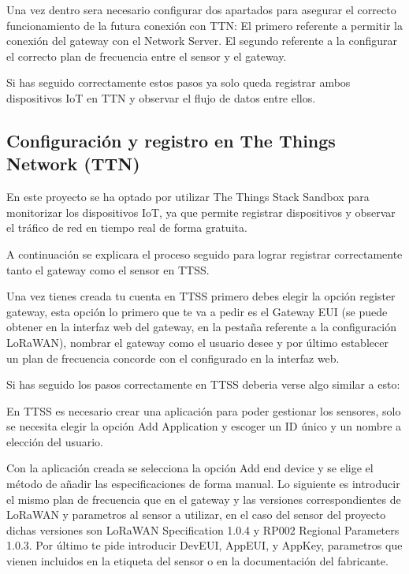 Una vez dentro sera necesario configurar dos apartados para asegurar el correcto funcionamiento de la futura conexión con TTN:
El primero referente a permitir la conexión del gateway con el Network Server.
El segundo referente a la configurar el correcto plan de frecuencia entre el sensor y el gateway.
  
Si has seguido correctamente estos pasos ya solo queda registrar ambos dispositivos IoT en TTN y observar el flujo de datos entre ellos.


\subsection{Configuración y registro en The Things Network (TTN) }
En este proyecto se ha optado por utilizar The Things Stack Sandbox para monitorizar los dispositivos IoT, ya que permite registrar dispositivos y observar el tráfico de red en tiempo real de forma gratuita.

A continuación se explicara el proceso seguido para lograr registrar correctamente tanto el gateway como el sensor en TTSS.

Una vez tienes creada tu cuenta en TTSS primero debes elegir la opción register gateway, esta opción lo primero que te va a pedir es el Gateway EUI (se puede obtener en la interfaz web del gateway, en la pestaña referente a la configuración LoRaWAN), nombrar el gateway como el usuario desee y por último establecer un plan de frecuencia concorde con el configurado en la interfaz web. 

Si has seguido los pasos correctamente en TTSS deberia verse algo similar a esto:

En TTSS es necesario crear una aplicación para poder gestionar los sensores, solo se necesita elegir la opción Add Application  y escoger un ID único y un nombre a elección del usuario. 

Con la aplicación creada se selecciona la opción Add end device y se elige el método de añadir las especificaciones de forma manual. Lo siguiente es introducir el mismo plan de frecuencia que en el gateway y las versiones correspondientes de LoRaWAN y parametros al sensor a utilizar, en el caso del sensor del proyecto dichas versiones son 
LoRaWAN Specification 1.0.4 y 
RP002 Regional Parameters 1.0.3. Por último te pide introducir  DevEUI, AppEUI, y AppKey, parametros que vienen incluidos en la etiqueta del sensor o en la documentación del fabricante.

